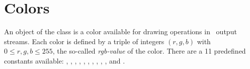 \ccSetTwoColumns{}{\hspace*{8cm}}



\section{Colors}
An object of the class  is a color available
for drawing operations in \cgal\ output streams.
Each color is defined by a triple of integers $(r,g,b)$ with
$0\le r,g,b \le 255$, the so-called {\em rgb-value} of the color.
There are a 11 predefined  constants available:
, , , , ,
, , , , ,
and .


